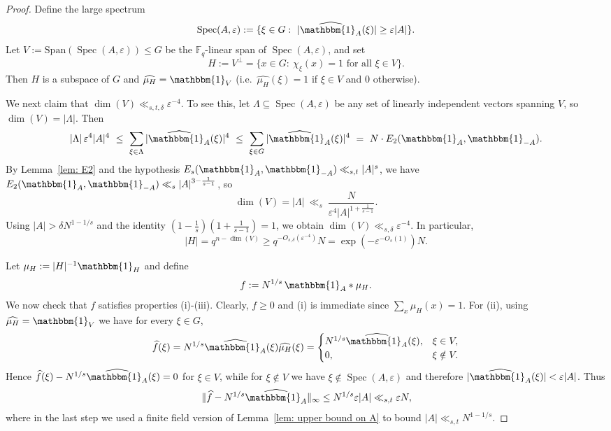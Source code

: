 \documentclass[10pt,a4paper]{amsart}
\newcommand{\F}{\mathbb{F}}
\newcommand{\e}{\mathbbm{1}}          %
\begin{document}
\begin{proof}
Define the large spectrum
\[
\operatorname{Spec}(A,\varepsilon):=\{\xi\in G:\ |\widehat{\e_A}(\xi)|\ge \varepsilon |A|\}.
\]
Let $V:=\mathrm{Span}(\operatorname{Spec}(A,\varepsilon))\le G$ be the $\F_q$-linear span of $\operatorname{Spec}(A,\varepsilon)$, and set
\[
H:=V^\perp=\{x\in G:\ \chi_\xi(x)=1 \text{ for all }\xi\in V\}.
\]
Then $H$ is a subspace of $G$ and $\widehat{\mu_H}=\e_V$ (i.e.\ $\widehat{\mu_H}(\xi)=1$ if
$\xi\in V$ and $0$ otherwise).

We next claim that $\dim(V)\ll_{s,t,\delta}\varepsilon^{-4}$. To see this, let $\Lambda\subseteq \operatorname{Spec}(A,\varepsilon)$ be any set of linearly independent vectors spanning
$V$, so $\dim(V)=|\Lambda|$.  Then
\[
|\Lambda|\,\varepsilon^4|A|^4\ \le\ \sum_{\xi\in\Lambda}|\widehat{\e_A}(\xi)|^4
\ \le\ \sum_{\xi\in G}|\widehat{\e_A}(\xi)|^4
\ =\ N\cdot E_2(\e_A,\e_{-A}).
\]
By Lemma~\ref{lem: E2} and the hypothesis
$E_s(\e_A,\e_{-A})\ll_{s,t}|A|^s$, we have
$E_2(\e_A,\e_{-A})\ll_s |A|^{3-\frac{1}{s-1}}$, so
\[
\dim(V) = |\Lambda| \ \ll_s\ \frac{N}{\varepsilon^4|A|^{1+\frac{1}{s-1}}}.
\]
Using $|A|>\delta N^{1-1/s}$ and the identity
$(1-\tfrac1s)(1+\tfrac{1}{s-1})=1$, we obtain $\dim(V)\ll_{s,\delta}\varepsilon^{-4}$.
In particular,
\begin{equation}\label{eqn: H}
|H|=q^{n-\dim(V)}\ge q^{-O_{s,\delta}(\varepsilon^{-4})}N=\exp(-\varepsilon^{-O_s(1)})N.    
\end{equation}

Let $\mu_H:=|H|^{-1}\e_H$ and define
\[
f:=N^{1/s}\,\e_A*\mu_H.
\]
We now check that $f$ satisfies properties (i)-(iii). Clearly, $f\ge0$ and (i) is immediate since $\sum_x \mu_H(x)=1$. For (ii), using $\widehat{\mu_H}=\e_V$ we have for every $\xi\in G$,
\[
\widehat f(\xi)=N^{1/s}\widehat{\e_A}(\xi)\widehat{\mu_H}(\xi)
=
\begin{cases}
N^{1/s}\widehat{\e_A}(\xi),& \xi\in V,\\
0,& \xi\notin V.
\end{cases}
\]
Hence $\widehat f(\xi)-N^{1/s}\widehat{\e_A}(\xi)=0$ for $\xi\in V$, while for $\xi\notin V$ we have
$\xi\notin \operatorname{Spec}(A,\varepsilon)$ and therefore $|\widehat{\e_A}(\xi)|<\varepsilon|A|$.  Thus
\[
\|\widehat f-N^{1/s}\widehat{\e_A}\|_\infty
\le N^{1/s}\varepsilon|A|
\ll_{s,t}\varepsilon N,
\]
where in the last step we used a finite field version of  Lemma~\ref{lem: upper bound on A} to bound $|A|\ll_{s,t}N^{1-1/s}$.


\end{proof}
\end{document}
